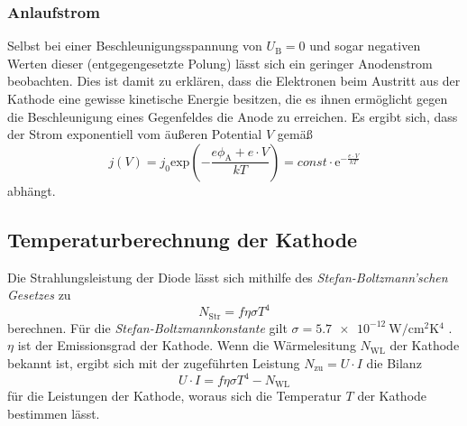 \subsubsection{Anlaufstrom}
Selbst bei einer Beschleunigungsspannung von $U_\text{B} = 0$ und sogar negativen Werten dieser (entgegengesetzte Polung) lässt sich ein geringer Anodenstrom beobachten.
Dies ist damit zu erklären, dass die Elektronen beim Austritt aus der Kathode eine gewisse kinetische Energie besitzen, die es ihnen ermöglicht gegen die Beschleunigung
eines Gegenfeldes die Anode zu erreichen.
Es ergibt sich, dass der Strom exponentiell vom äußeren Potential $V$ gemäß
\begin{equation}
    \label{eqn:j_Anlauf}
    j(V) = j_0 \mathrm{exp}\left(-\frac{e\phi_\text{A} + e \cdot V}{kT} \right) = const \cdot \mathrm{e}^{-\frac{e \cdot V}{kT}}
\end{equation}
abhängt.

\subsection{Temperaturberechnung der Kathode}
\label{subsec:Temperatur_Kathode}
Die Strahlungsleistung der Diode lässt sich mithilfe des \textit{Stefan-Boltzmann'schen Gesetzes} zu 
\begin{equation*}
    N_\text{Str} = f \eta \sigma T^4
\end{equation*}
berechnen. Für die \textit{Stefan-Boltzmannkonstante} gilt $\sigma = \qty{5.7e-12}{\watt\per\centi\metre\squared\kelvin^4}$ \cite{scipy}. $\eta$ ist der Emissionsgrad
der Kathode. Wenn die Wärmelesitung $N_\text{WL}$ der Kathode bekannt ist, ergibt sich mit der zugeführten Leistung $N_\text{zu} = U \cdot I$ die Bilanz
\begin{equation}
    \label{eqn:Leistung}
    U \cdot I = f \eta \sigma T^4 - N_\text{WL}
\end{equation} 
für die Leistungen der Kathode, woraus sich die Temperatur $T$ der Kathode bestimmen lässt.
